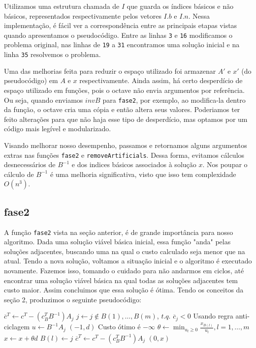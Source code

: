 \documentclass[12pt]{article}
\begin{document}
	
	Utilizamos uma estrutura chamada de $I$ que guarda os índices básicos e não básicos, representados respectivamente pelos vetores $I.b$ e $I.n$. Nessa implementação, é fácil ver a correspondência entre as principais etapas vistas quando apresentamos o pseudocódigo. Entre as linhas \texttt{3} e \texttt{16} modificamos o problema original, nas linhas de \texttt{19} a \texttt{31} encontramos uma solução inicial e na linha \texttt{35} resolvemos o problema.
    
    Uma das melhorias feita para reduzir o espaço utilizado foi armazenar $A'$ e $x'$ (do pseudocódigo) em $A$ e $x$ respectivamente. Ainda assim, há certo desperdício de espaço utilizado em funções, pois o octave não envia argumentos por referência. Ou seja, quando enviamos $invB$ para \texttt{fase2}, por exemplo, ao modifica-la dentro da função, o octave cria uma cópia e então altera seus valores. Poderiamos ter feito alterações para que não haja esse tipo de desperdício, mas optamos por um código mais legível e modularizado.
    
    Visando melhorar nosso desempenho, passamos e retornamos alguns argumentos extras nas funções \texttt{fase2} e \texttt{removeArtificials}. Dessa forma, evitamos cálculos desnecessários de $B^{-1}$ e dos indices básicos associados à solução $x$. Nos poupar o cálculo de $B^{-1}$ é uma melhoria significativa, visto que isso tem complexidade $O(n^3)$.


\subsection{fase2}
	A função \texttt{fase2} vista na seção anterior, é de grande importância para nosso algoritmo. Dada uma solução viável básica inicial, essa função "anda" pelas soluções adjacentes, buscando uma na qual o custo calculado seja menor que na atual. Tendo a nova solução, voltamos a situação inicial e o algoritmo é executado novamente. Fazemos isso, tomando o cuidado para não andarmos em ciclos, até encontrar uma solução viável básica na qual todas as soluções adjacentes tem custo maior. Assim concluimos que essa solução é ótima. Tendo os conceitos da seção 2, produzimos o seguinte pseudocódigo:

\begin{algorithmic}
		\State $\overline{c}^T \gets c^T - (c_B^T B^{-1})A_j$
			\State $j \gets j \not\in {B(1), \dots, B(m)}$, $t.q.$ $\overline{c}_j < 0$ \Comment Usando regra anti-ciclagem
			\State $u \gets B^{-1} A_j$
				\Return $(-1, d)$ \Comment Custo ótimo é $-\infty$
			\EndIf
			\State $\theta \gets \min_{u_l \geq 0} {\frac{x_{B(l)}}{u_l}}, l = 1, \dots, m$
			\State $x \gets x + \theta d$
			\State $B(l) \gets j$
			\State {}
			\State $\overline{c}^T \gets c^T - (c_B^T B^{-1})A_j$
		\EndWhile
		\Return $(0, x)$
	\EndFunction	
\end{algorithmic}
\end{document}
